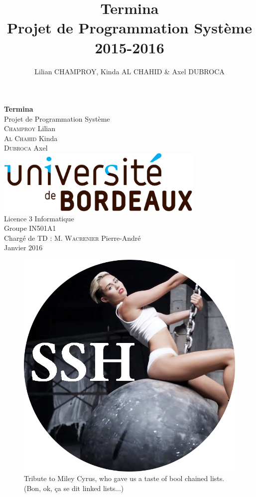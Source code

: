 \documentclass[10pt,a4paper]{report}
\title{Termina\\\large{}Projet de Programmation Système\\2015-2016}
\author{Lilian CHAMPROY, Kinda AL CHAHID & Axel DUBROCA}
\begin{document}
\begin{titlepage}
   \begin{center}
       \vspace*{3cm}
       \LARGE
       \textbf{\huge{}Termina}\\[0.25cm]
       \LARGE
       Projet de Programmation Système\\[2.5cm]
       \textsc{Champroy} Lilian\\
       \textsc{Al Chahid} Kinda\\
       \textsc{Dubroca} Axel\\
       \vfill  
        \includegraphics[width=10cm]{Logo-Universite.png}\\[3cm]  
       \Large
       Licence 3 Informatique\\
       Groupe IN501A1\\
       Chargé de TD : M. \textsc{Wacrenier} Pierre-André\\
       Janvier 2016
   \end{center}
\end{titlepage}

\pagestyle{headings}
\setcounter{tocdepth}{1}

\begin{figure}[p]
\centering
\includegraphics[width=400pt]{Icone-officielle.png}
\caption{Tribute to Miley Cyrus, who gave us a taste of bool chained lists.\\(Bon, ok, ça se dit linked lists...)}
\end{figure}

\tableofcontents
\newpage


\newpage

\newpage

\newpage

\newpage

\newpage

\newpage

\end{document}
